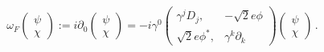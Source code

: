 \begin{equation}
\omega_F \left( \begin{array}{c} \psi \\ \chi \end{array} \right)
:=i\partial_0 
\left( \begin{array}{c} \psi \\ \chi \end{array} \right)
=-i\gamma^0 
\left( \begin{array}{cc} \gamma^j D_j ,& -\sqrt{2} e\phi \\
                         \sqrt{2} e\phi^* ,& \gamma^k \partial_k
\end{array} \right) 
\left( \begin{array}{c} \psi \\ \chi \end{array} \right) \,.
\label{Direq}
\end{equation}

